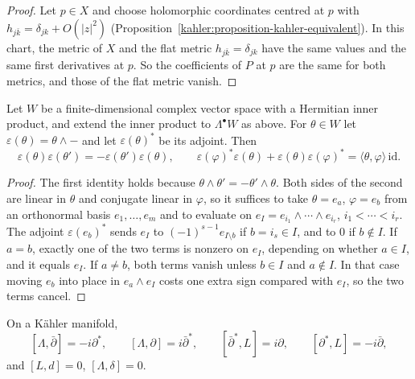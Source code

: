 \begin{proof}
Let $p \in X$ and choose holomorphic coordinates centred at $p$ with $h_{j\bar k} = \delta_{jk} + O(|z|^2)$
(Proposition~\ref{kahler:proposition-kahler-equivalent}). In this chart, the metric of $X$ and the flat metric $h_{j\bar k} = \delta_{jk}$ have
the same values and the same first derivatives at $p$. So the coefficients of $P$ at $p$ are the same for both metrics, and those of
the flat metric vanish.
\end{proof}

\begin{lemma}\label{hodge-decomposition:lemma-car}
Let $W$ be a finite-dimensional complex vector space with a Hermitian inner product, and extend the inner product to $\Lambda^\bullet W$
as above. For $\theta \in W$ let $\varepsilon(\theta) = \theta \wedge -$ and let $\varepsilon(\theta)^*$ be its adjoint. Then
\[
\varepsilon(\theta)\varepsilon(\theta') = -\varepsilon(\theta')\varepsilon(\theta), \qquad
\varepsilon(\varphi)^*\varepsilon(\theta) + \varepsilon(\theta)\varepsilon(\varphi)^* = \langle\theta, \varphi\rangle\,\mathrm{id}.
\]
\end{lemma}

\begin{proof}
The first identity holds because $\theta \wedge \theta' = -\theta' \wedge \theta$. Both sides of the second are linear in $\theta$ and
conjugate linear in $\varphi$, so it suffices to take $\theta = e_a$, $\varphi = e_b$ from an orthonormal basis $e_1, \ldots, e_m$ and to
evaluate on $e_I = e_{i_1} \wedge \cdots \wedge e_{i_r}$, $i_1 < \cdots < i_r$. The adjoint $\varepsilon(e_b)^*$ sends $e_I$ to
$(-1)^{s-1}e_{I \setminus b}$ if $b = i_s \in I$, and to $0$ if $b \notin I$. If $a = b$, exactly one of the two terms is nonzero on
$e_I$, depending on whether $a \in I$, and it equals $e_I$. If $a \neq b$, both terms vanish unless $b \in I$ and $a \notin I$. In that case
moving $e_b$ into place in $e_a \wedge e_I$ costs one extra sign compared with $e_I$, so the two terms cancel.
\end{proof}

\begin{theorem}\label{hodge-decomposition:theorem-kahler-identities}
On a K\"ahler manifold,
\[
[\Lambda, \bar\partial] = -i\partial^*, \qquad [\Lambda, \partial] = i\bar\partial^*, \qquad [\bar\partial^*, L] = i\partial, \qquad [\partial^*, L] = -i\bar\partial,
\]
and $[L, d] = 0$, $[\Lambda, \delta] = 0$.
\end{theorem}

